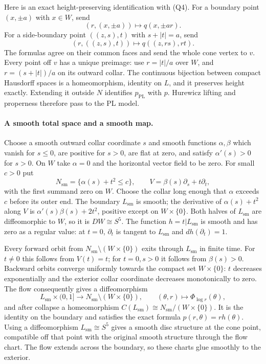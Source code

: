 \documentclass[11pt,a4paper]{article}
\theoremstyle{definition}
\begin{document}
Here is an exact height-preserving identification with (Q4).  For a
boundary point $(x,\pm a)$ with $x\in W$, send
\[
 (r,(x,\pm a))\longmapsto q(x,\pm ar).
\]
For a side-boundary point $((z,s),t)$ with $s+|t|=a$, send
\[
 (r,((z,s),t))\longmapsto q((z,rs),rt).
\]
The formulas agree on their common faces and send the whole cone vertex
to $v$.  Every point off $v$ has a unique preimage: use $r=|t|/a$ over $W$,
and $r=(s+|t|)/a$ on its outward collar.  The continuous bijection between
compact Hausdorff spaces is a homeomorphism, identity on $L$, and it
preserves height exactly.  Extending it outside $N$ identifies
$p_{\mathrm{PL}}$ with $p$.  Hurewicz lifting and properness therefore pass
to the PL model.

\paragraph{A smooth total space and a smooth map.}
Choose a smooth outward collar coordinate $s$ and smooth functions
$\alpha,\beta$ which vanish for $s\le0$, are positive for $s>0$, are flat
at zero, and satisfy $\alpha'(s)>0$ for $s>0$.  On $W$ take $\alpha=0$ and
the horizontal vector field to be zero.  For small $c>0$ put
\[
 N_{\mathrm{sm}}=\{\alpha(s)+t^2\le c\},\qquad
 V=\beta(s)\partial_s+t\partial_t,
 \tag{Q8}
\]
with the first summand zero on $W$.  Choose the collar long enough that
$\alpha$ exceeds $c$ before its outer end.  The boundary $L_{\mathrm{sm}}$
is smooth; the derivative of $\alpha(s)+t^2$ along $V$ is
$\alpha'(s)\beta(s)+2t^2$, positive except on $W\times\{0\}$.
Both halves of $L_{\mathrm{sm}}$ are diffeomorphic to $W$, so it is
$DW\cong S^5$.  The function $h=t|L_{\mathrm{sm}}$ is smooth and has zero
as a regular value: at $t=0$, $\partial_t$ is tangent to $L_{\mathrm{sm}}$
and $dh(\partial_t)=1$.

Every forward orbit from $N_{\mathrm{sm}}\setminus(W\times\{0\})$ exits
through $L_{\mathrm{sm}}$ in finite time.  For $t\ne0$ this follows from
$V(t)=t$; for $t=0,s>0$ it follows from $\beta(s)>0$.
Backward orbits converge uniformly towards the compact set
$W\times\{0\}$: $t$ decreases exponentially and the exterior collar
coordinate decreases monotonically to zero.  The flow consequently gives
a diffeomorphism
\[
 L_{\mathrm{sm}}\times(0,1]\longrightarrow
 N_{\mathrm{sm}}\setminus(W\times\{0\}),\qquad
 (\theta,r)\longmapsto\Phi_{\log r}(\theta),
\]
and after collapse a homeomorphism $C(L_{\mathrm{sm}})\cong
N_{\mathrm{sm}}/(W\times\{0\})$.  It is the identity on the boundary and
satisfies the exact formula $p(r,\theta)=rh(\theta)$.
Using a diffeomorphism $L_{\mathrm{sm}}\cong S^5$ gives a smooth disc
structure at the cone point, compatible off that point with the original
smooth structure through the flow chart.  The flow extends across the
boundary, so these charts glue smoothly to the exterior.
\end{document}
